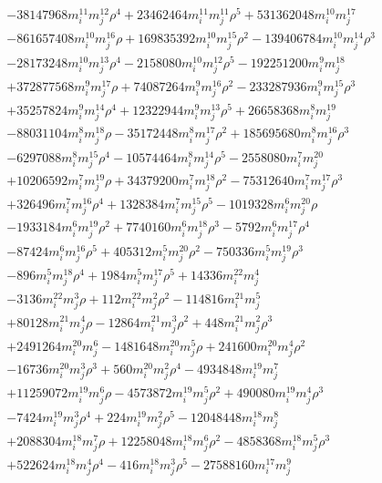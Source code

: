 {\begin{align*}
&-38147968m_i^{11}m_j^{12}\rho^{4}+23462464m_i^{11}m_j^{11}\rho^{5}+531362048m_i^{10}m_j^{17}\\
&-861657408m_i^{10}m_j^{16}\rho+169835392m_i^{10}m_j^{15}\rho^{2}-139406784m_i^{10}m_j^{14}\rho^{3}\\
&-28173248m_i^{10}m_j^{13}\rho^{4}-2158080m_i^{10}m_j^{12}\rho^{5}-192251200m_i^{9}m_j^{18}\\
&+372877568m_i^{9}m_j^{17}\rho+74087264m_i^{9}m_j^{16}\rho^{2}-233287936m_i^{9}m_j^{15}\rho^{3}\\
&+35257824m_i^{9}m_j^{14}\rho^{4}+12322944m_i^{9}m_j^{13}\rho^{5}+26658368m_i^{8}m_j^{19}\\
&-88031104m_i^{8}m_j^{18}\rho-35172448m_i^{8}m_j^{17}\rho^{2}+185695680m_i^{8}m_j^{16}\rho^{3}\\
&-6297088m_i^{8}m_j^{15}\rho^{4}-10574464m_i^{8}m_j^{14}\rho^{5}-2558080m_i^{7}m_j^{20}\\
&+10206592m_i^{7}m_j^{19}\rho+34379200m_i^{7}m_j^{18}\rho^{2}-75312640m_i^{7}m_j^{17}\rho^{3}\\
&+326496m_i^{7}m_j^{16}\rho^{4}+1328384m_i^{7}m_j^{15}\rho^{5}-1019328m_i^{6}m_j^{20}\rho\\
&-1933184m_i^{6}m_j^{19}\rho^{2}+7740160m_i^{6}m_j^{18}\rho^{3}-5792m_i^{6}m_j^{17}\rho^{4}\\
&-87424m_i^{6}m_j^{16}\rho^{5}+405312m_i^{5}m_j^{20}\rho^{2}-750336m_i^{5}m_j^{19}\rho^{3}\\
&-896m_i^{5}m_j^{18}\rho^{4}+1984m_i^{5}m_j^{17}\rho^{5}+14336m_i^{22}m_j^{4}\\
&-3136m_i^{22}m_j^{3}\rho+112m_i^{22}m_j^{2}\rho^{2}-114816m_i^{21}m_j^{5}\\
&+80128m_i^{21}m_j^{4}\rho-12864m_i^{21}m_j^{3}\rho^{2}+448m_i^{21}m_j^{2}\rho^{3}\\
&+2491264m_i^{20}m_j^{6}-1481648m_i^{20}m_j^{5}\rho+241600m_i^{20}m_j^{4}\rho^{2}\\
&-16736m_i^{20}m_j^{3}\rho^{3}+560m_i^{20}m_j^{2}\rho^{4}-4934848m_i^{19}m_j^{7}\\
&+11259072m_i^{19}m_j^{6}\rho-4573872m_i^{19}m_j^{5}\rho^{2}+490080m_i^{19}m_j^{4}\rho^{3}\\
&-7424m_i^{19}m_j^{3}\rho^{4}+224m_i^{19}m_j^{2}\rho^{5}-12048448m_i^{18}m_j^{8}\\
&+2088304m_i^{18}m_j^{7}\rho+12258048m_i^{18}m_j^{6}\rho^{2}-4858368m_i^{18}m_j^{5}\rho^{3}\\
&+522624m_i^{18}m_j^{4}\rho^{4}-416m_i^{18}m_j^{3}\rho^{5}-27588160m_i^{17}m_j^{9}\\

\end{align*}}

